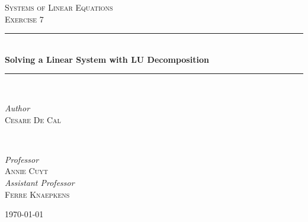 \documentclass{article}
\begin{document}

\begin{titlepage} %
	\newcommand{\HRule}{\rule{\linewidth}{0.5mm}}%
	
	\center %
	
	
	\textsc{\Large Systems of Linear Equations}\\[0.5cm] %
	
	\textsc{\large Exercise 7}\\[0.5cm] %
	
	
	\HRule\\[0.6cm]
	
	{\huge\bfseries Solving a Linear System with LU Decomposition}\\[0.25cm] %
	
	\HRule\\[1.5cm]
	
	
	\begin{minipage}{0.4\textwidth}
		\begin{flushleft}
			\large
			\textit{Author}\\
			\textsc{Cesare De Cal} %
		\end{flushleft}
	\end{minipage}
	~
	\begin{minipage}{0.4\textwidth}
		\begin{flushright}
			\large
			\textit{Professor}\\
			\textsc{Annie Cuyt}\\ %
			[0.25cm]
			\textit{Assistant Professor}\\
			\textsc{Ferre Knaepkens} %

		\end{flushright}
	\end{minipage}
		
	\vfill\vfill\vfill
	
	{\large\today}
		
	\vfill
	
\end{titlepage}
\end{document}
